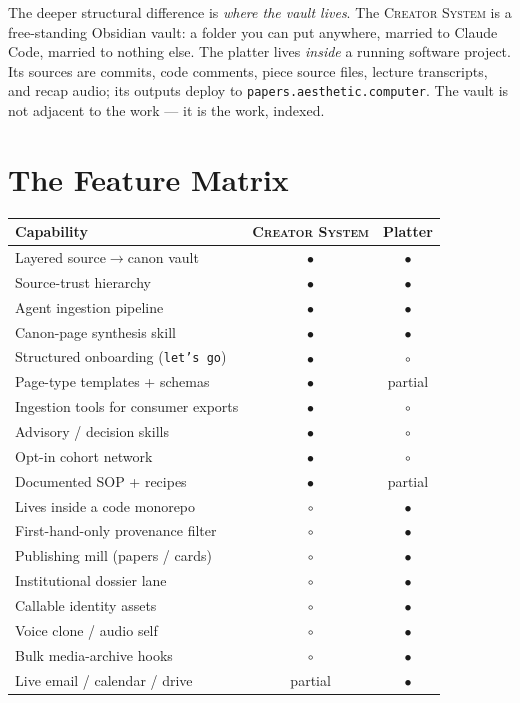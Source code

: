 \documentclass[10pt,letterpaper,twocolumn]{article}
\newcommand{\cs}{\textsc{Creator System}}
\newcommand{\yes}{{\color{acpurple}\textbf{$\bullet$}}}
\newcommand{\no}{{\color{acgray}$\circ$}}
\begin{document}
The deeper structural difference is \emph{where the vault lives}. The \cs{} is a free-standing Obsidian vault: a folder you can put anywhere, married to Claude Code, married to nothing else. The platter lives \emph{inside} a running software project. Its sources are commits, code comments, piece source files, lecture transcripts, and recap audio; its outputs deploy to \texttt{papers.aesthetic.computer}. The vault is not adjacent to the work --- it is the work, indexed.


\section{The Feature Matrix}
\label{sec:features}

{\centering
\footnotesize
\renewcommand{\arraystretch}{1.15}
\begin{tabularx}{\columnwidth}{@{}Xcc@{}}
\toprule
\textbf{Capability} & \textbf{\cs} & \textbf{Platter} \\
\midrule
Layered source$\rightarrow$canon vault & \yes & \yes \\
Source-trust hierarchy & \yes & \yes \\
Agent ingestion pipeline & \yes & \yes \\
Canon-page synthesis skill & \yes & \yes \\
Structured onboarding (\texttt{let's go}) & \yes & \no \\
Page-type templates + schemas & \yes & partial \\
Ingestion tools for consumer exports & \yes & \no \\
Advisory / decision skills & \yes & \no \\
Opt-in cohort network & \yes & \no \\
Documented SOP + recipes & \yes & partial \\
Lives inside a code monorepo & \no & \yes \\
First-hand-only provenance filter & \no & \yes \\
Publishing mill (papers / cards) & \no & \yes \\
Institutional dossier lane & \no & \yes \\
Callable identity assets & \no & \yes \\
Voice clone / audio self & \no & \yes \\
Bulk media-archive hooks & \no & \yes \\
Live email / calendar / drive & partial & \yes \\
\bottomrule
\end{tabularx}
\par}
\end{document}
